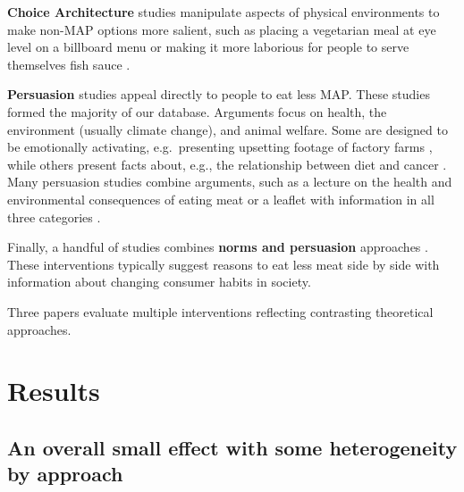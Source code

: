 \documentclass[sn-nature,pdflatex]{sn-jnl}
\begin{document}
\textbf{Choice Architecture} studies
\citep{andersson2021, kanchanachitra2020} manipulate aspects of physical
environments to make non-MAP options more salient, such as placing a
vegetarian meal at eye level on a billboard menu \citep{andersson2021}
or making it more laborious for people to serve themselves fish sauce
\citep{kanchanachitra2020}.

\textbf{Persuasion} studies
\citep{kanchanachitra2020, bochmann2017, bschaden2020, cooney2016, feltz2022, haile2021, mathur2021effectiveness, peacock2017, polanco2022, sparkman2021, abrahamse2007, acharya2004, banjerjee2019, berndsen2005, bertolaso2015, bianchi2022, fehrenbach2015, hatami2018, jalil2023, merrill2009, norris2014, shreedhar2021, weingarten2022}
appeal directly to people to eat less MAP. These studies formed the
majority of our database. Arguments focus on health, the environment
(usually climate change), and animal welfare. Some are designed to be
emotionally activating, e.g.~presenting upsetting footage of factory
farms \citep{bertolaso2015}, while others present facts about, e.g., the
relationship between diet and cancer \citep{hatami2018}. Many persuasion
studies combine arguments, such as a lecture on the health and
environmental consequences of eating meat \citep{jalil2023} or a leaflet
with information in all three categories \citep{hennessy2016}.

Finally, a handful of studies combines \textbf{norms and persuasion}
approaches \citep{hennessy2016, carfora2023, mattson2020, piester2020}.
These interventions typically suggest reasons to eat less meat side by
side with information about changing consumer habits in society.

Three papers \citep{piester2020, hennessy2016, kanchanachitra2020}
evaluate multiple interventions reflecting contrasting theoretical
approaches.

\begin{comment} 
Note that two interventions also provide free meat alternatives?
\end{comment}

\section{Results}\label{sec2}

\subsection{An overall small effect with some heterogeneity by
approach}\label{sec2.1}
\end{document}
